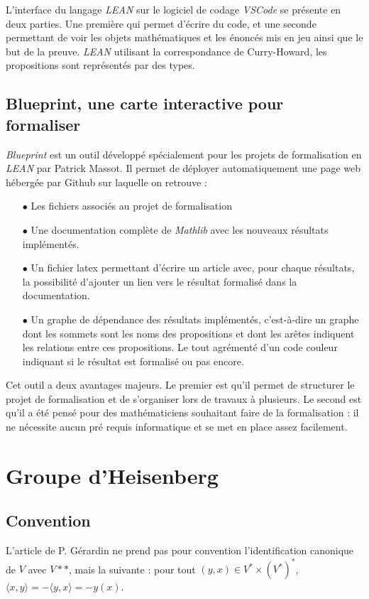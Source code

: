 \documentclass[10pt]{article}
\theoremstyle{definition}
\begin{document}
L'interface du langage \textit{LEAN} sur le logiciel de codage \textit{VSCode} se présente en deux parties. Une première qui permet d'écrire du code, et une seconde permettant de voir les  objets mathématiques et les énoncés mis en jeu ainsi que le but de la preuve. \textit{LEAN} utilisant la correspondance de Curry-Howard, les propositions sont représentés par des types.

\subsection{Blueprint, une carte interactive pour formaliser}

\textit{Blueprint} est un outil développé spécialement pour les projets de formalisation en \textit{LEAN} par Patrick Massot. Il permet de déployer automatiquement une page web hébergée par Github sur laquelle on retrouve : 
\begin{itemize}
	\item [$\bullet$] Les fichiers associés au projet de formalisation
	\item[$\bullet$] Une documentation complète de \textit{Mathlib} avec les nouveaux résultats implémentés.
	\item [$\bullet$] Un fichier latex permettant d'écrire un article avec, pour chaque résultats, la possibilité d'ajouter un lien vers le résultat formalisé dans la documentation.
	\item[$\bullet$] Un graphe de dépendance des résultats implémentés, c'est-à-dire un graphe dont les sommets sont les noms des propositions et dont les arêtes indiquent les relations entre ces propositions. Le tout agrémenté d'un code couleur indiquant si le résultat est formalisé ou pas encore.
\end{itemize}

Cet outil a deux avantages majeurs. Le premier est qu'il permet de structurer le projet de formalisation et de s'organiser lors de travaux à plusieurs. Le second est qu'il a été pensé pour des mathématiciens souhaitant faire de la formalisation : il ne nécessite aucun pré requis informatique et se met en place assez facilement.


\section{Groupe d'Heisenberg}

\subsection{Convention}
L'article de P. Gérardin ne prend pas pour convention l'identification canonique de $V$ avec $V**$, mais la suivante : pour tout $(y,x)\in V^*\times (V^*)^* $, $\langle x, y\rangle = -\langle y,x\rangle = - y(x)$. 
\end{document}
